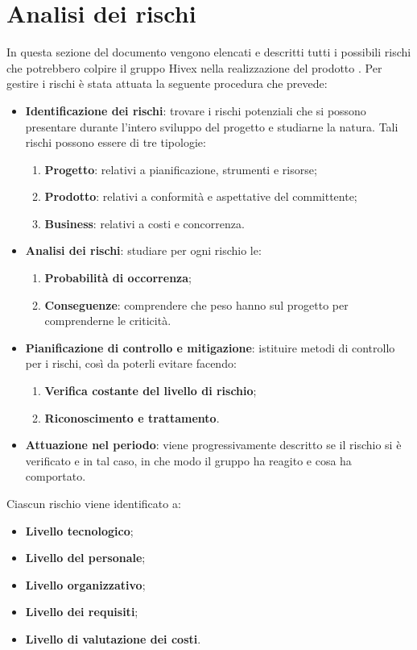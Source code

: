 \section{Analisi dei rischi}
In questa sezione del documento vengono elencati e descritti tutti i possibili rischi che potrebbero colpire il gruppo Hivex nella realizzazione del prodotto \proj. Per gestire i rischi è stata attuata la seguente procedura che prevede:
\begin{itemize}
	\item \textbf{Identificazione dei rischi}: trovare i rischi potenziali che si possono presentare durante l'intero sviluppo del progetto e studiarne la natura. Tali rischi possono essere di tre tipologie:
	\begin{enumerate}
		\item \textbf{Progetto}: relativi a pianificazione, strumenti e risorse;
		\item \textbf{Prodotto}: relativi a conformità e aspettative del committente;
		\item \textbf{Business}: relativi a costi e concorrenza.
	\end{enumerate}
	\item \textbf{Analisi dei rischi}: studiare per ogni rischio le:
	\begin{enumerate}
		\item \textbf{Probabilità di occorrenza};
		\item \textbf{Conseguenze}: comprendere che peso hanno sul progetto per comprenderne le criticità.
	\end{enumerate}
	\item \textbf{Pianificazione di controllo e mitigazione}: istituire metodi di controllo per i rischi, così da poterli evitare facendo:
	\begin{enumerate}
		\item \textbf{Verifica costante del livello di rischio};
		\item \textbf{Riconoscimento e trattamento}.
	\end{enumerate}
	\item \textbf{Attuazione nel periodo}: viene progressivamente descritto se il rischio si è verificato e in tal caso, in che modo il gruppo ha reagito e cosa ha comportato.
\end{itemize}
Ciascun rischio viene identificato a:
\begin{itemize}
	\item \textbf{Livello tecnologico};
	\item \textbf{Livello del personale};
	\item \textbf{Livello organizzativo};
	\item \textbf{Livello dei requisiti};
	\item \textbf{Livello di valutazione dei costi}.
\end{itemize}
